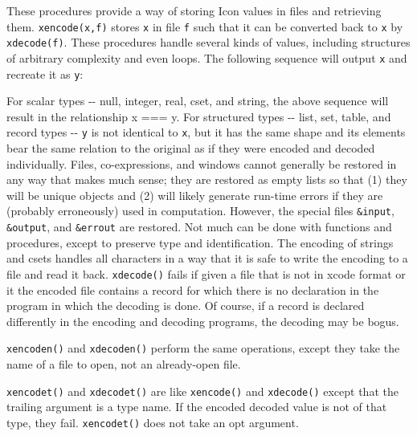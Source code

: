 These procedures provide a way of storing Icon values in files and
retrieving them. \texttt{xencode(x,f)} stores \texttt{x} in file
\texttt{f} such that it can be converted back to \texttt{x} by
\texttt{xdecode(f)}. These procedures handle several kinds of values,
including structures of arbitrary complexity and even loops. The
following sequence will output \texttt{x} and recreate it as
\texttt{y}:


For {\textquotedbl}scalar{\textquotedbl} types -{}- null, integer, real,
cset, and string, the above sequence will result in the relationship x
=== y. For structured types -{}- list, set, table, and record types
-{}- \texttt{y} is not identical to \texttt{x}, but it has the same
{\textquotedbl}shape{\textquotedbl} and its elements bear the same
relation to the original as if they were encoded and decoded
individually. Files, co-expressions, and windows cannot generally be
restored in any way that makes much sense; they are restored as empty
lists so that (1) they will be unique objects and (2) will likely
generate run-time errors if they are (probably
erroneously) used in computation. However, the special files
\texttt{\&input}, \texttt{\&output}, and \texttt{\&errout} are
restored. Not much can be done with functions and procedures, except to
preserve type and identification. The encoding of strings and csets
handles all characters in a way that it is safe to write the encoding
to a file and read it back. \texttt{xdecode()} fails if given a file
that is not in xcode format or it the encoded file contains a record
for which there is no declaration in the program in which the decoding
is done. Of course, if a record is declared differently in the encoding
and decoding programs, the decoding may be bogus.

\texttt{xencoden()} and \texttt{xdecoden()} perform the same operations,
except they take the name of a file to open, not an already-open file.

\texttt{xencodet()} and \texttt{xdecodet()} are like \texttt{xencode()}
and \texttt{xdecode()} except that the trailing argument is a type
name. If the encoded decoded value is not of that type, they fail.
\texttt{xencodet()} does not take an opt argument. 

